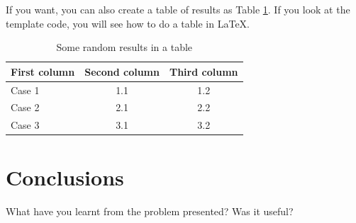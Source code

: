 \documentclass[a4paper, 11pt]{article}
\begin{document}
If you want, you can also create a table of results as Table
\ref{tab:results}. If you look at the template code, you will see how
to do a table in \LaTeX.

\begin{table}[h]
\centering
\begin{tabular}{lcc}
First column & Second column & Third column\\\hline
Case 1 & 1.1 & 1.2\\\hline
Case 2 & 2.1 & 2.2\\\hline
Case 3 & 3.1 & 3.2\\\hline
\end{tabular}
\caption{Some random results in a table}
\label{tab:results}
\end{table}

\section{Conclusions}


What have you learnt from the problem presented?
Was it useful?
\end{document}
